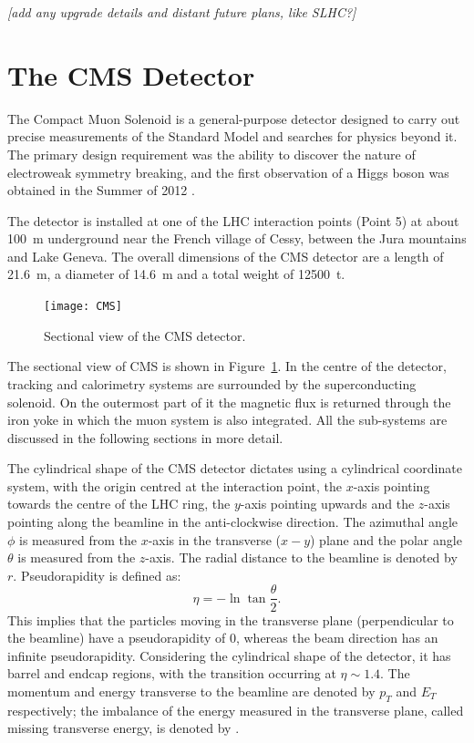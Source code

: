 \textit{[add any upgrade details and distant future plans, like SLHC?]}

\section{The CMS Detector}
The Compact Muon Solenoid \cite{CMS} is a general-purpose detector designed to carry out precise measurements of the
Standard Model and searches for physics beyond it. The primary design requirement was the ability to discover the nature
of electroweak symmetry breaking, and the first observation of a Higgs boson was obtained in the Summer of 2012
\cite{CMS_Higgs}.

The detector is installed at one of the LHC interaction points (Point 5) at about \SI{100}{\metre} underground near the
French village of Cessy, between the Jura mountains and Lake Geneva. The overall dimensions of the CMS detector are a
length of \SI{21.6}{\metre}, a diameter of \SI{14.6}{\metre} and a total weight of \SI{12500}{\tonne}.

\begin{figure}[htbp]
  \begin{center}
    \leavevmode
    \texttt{[image: CMS]}
    \caption{Sectional view of the CMS detector.}
    \label{CMS}
  \end{center}
\end{figure}

The sectional view of CMS is shown in Figure~\ref{CMS}. In the centre of the detector, tracking and calorimetry systems
are surrounded by the superconducting solenoid. On the outermost part of it the magnetic flux is returned through the
iron yoke in which the muon system is also integrated. All the sub-systems are discussed in the following sections in
more detail.

The cylindrical shape of the CMS detector dictates using a cylindrical coordinate system, with the origin centred at the
interaction point, the $x$-axis pointing towards the centre of the LHC ring, the $y$-axis pointing upwards and the
$z$-axis pointing along the beamline in the anti-clockwise direction. The azimuthal angle $\phi$ is measured from the
$x$-axis in the transverse ($x-y$) plane and the polar angle $\theta$ is measured from the $z$-axis. The radial distance
to the beamline is denoted by $r$. Pseudorapidity is defined as:
\begin{equation}
  \eta = - \ln{\tan{\frac{\theta}{2}}}.
\end{equation}
This implies that the particles moving in the transverse plane (perpendicular to the beamline) have a pseudorapidity of
0, whereas the beam direction has an infinite pseudorapidity. Considering the cylindrical shape of the detector, it has
barrel and endcap regions, with the transition occurring at $\eta \sim 1.4$. The momentum and energy transverse to the
beamline are denoted by $p_T$ and $E_T$ respectively; the imbalance of the energy measured in the transverse plane,
called missing transverse energy, is denoted by \ETm.

